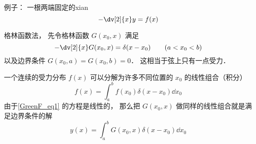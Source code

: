 
\begin{issues}
\issueDraft
\end{issues}


例子： 一根两端固定的xian
\begin{equation}\label{GreenF_eq1}
-\dv[2]{x} y = f(x)
\end{equation}


格林函数法， 先令格林函数 $G(x_0, x)$ 满足
\begin{equation}
-\dv[2]{x} G(x_0, x) = \delta(x - x_0) \qquad (a < x_0 < b)
\end{equation}
以及边界条件 $G(x_0, a) = G(x_0, b) = 0$． 这相当于弦上只有一点受力．

一个连续的受力分布 $f(x)$ 可以分解为许多不同位置的 $x_0$ 的线性组合（积分）
\begin{equation}
f(x) = \int_a^b f(x_0) \delta(x - x_0) \dd{x_0}
\end{equation}
由于\autoref{GreenF_eq1} 的方程是线性的， 那么把 $G(x_0, x)$ 做同样的线性组合就是满足边界条件的解
\begin{equation}
y(x) = \int_a^b G(x_0, x) \delta(x - x_0) \dd{x_0}
\end{equation}
